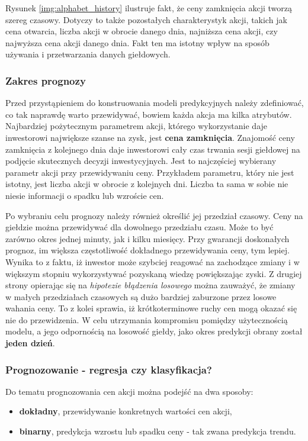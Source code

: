 \documentclass[a4paper, twoside, 11pt, openright]{article}
\begin{document}
Rysunek \ref{img:alphabet_history} ilustruje fakt, że ceny zamknięcia akcji tworzą szereg czasowy. Dotyczy to także pozostałych charakterystyk akcji, takich jak cena otwarcia, liczba akcji w obrocie danego dnia, najniższa cena akcji, czy najwyższa cena akcji danego dnia. Fakt ten ma istotny wpływ na sposób używania i przetwarzania danych giełdowych.

\subsubsection{Zakres prognozy}

Przed przystąpieniem do konstruowania modeli predykcyjnych należy zdefiniować, co tak naprawdę warto przewidywać, bowiem każda akcja ma kilka atrybutów. Najbardziej pożytecznym parametrem akcji, którego wykorzystanie daje inwestorowi największe szanse na zysk, jest \textbf{cena zamknięcia}. Znajomość ceny zamknięcia z kolejnego dnia daje inwestorowi cały czas trwania sesji giełdowej na podjęcie skutecznych decyzji inwestycyjnych. Jest to najczęściej wybierany parametr akcji przy przewidywaniu ceny. Przykładem parametru, który nie jest istotny, jest liczba akcji w obrocie z kolejnych dni. Liczba ta sama w sobie nie niesie informacji o spadku lub wzroście cen.

\bigskip

Po wybraniu celu prognozy należy również określić jej przedział czasowy. Ceny na giełdzie można przewidywać dla dowolnego przedziału czasu. Może to być zarówno okres jednej minuty, jak i kilku miesięcy. Przy gwarancji doskonałych prognoz, im większa częstotliwość dokładnego przewidywania ceny, tym lepiej. Wynika to z faktu, iż inwestor może szybciej reagować na zachodzące zmiany i w większym stopniu wykorzystywać pozyskaną wiedzę powiększając zyski. Z drugiej strony opierając się na \textit{hipotezie błądzenia losowego} można zauważyć, że zmiany w małych przedziałach czasowych są dużo bardziej zaburzone przez losowe wahania ceny. To z kolei sprawia, iż krótkoterminowe ruchy cen mogą okazać się nie do przewidzenia. W celu utrzymania kompromisu pomiędzy użytecznością modelu, a jego odpornością na losowość giełdy, jako okres predykcji obrany został \textbf{jeden dzień}.
 
\subsubsection{Prognozowanie - regresja czy klasyfikacja?}

Do tematu prognozowania cen akcji można podejść na dwa sposoby:
\begin{itemize}
\item{\textbf{dokładny}, przewidywanie konkretnych wartości cen akcji,}
\item{\textbf{binarny}, predykcja wzrostu lub spadku ceny - tak zwana predykcja trendu.}
\end{itemize}
\end{document}

